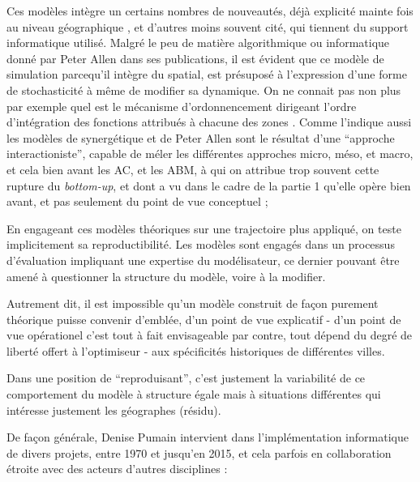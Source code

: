 Ces modèles intègre un certains nombres de nouveautés, déjà explicité mainte fois au niveau géographique \autocites{Pumain1989, Sanders1992}, et d'autres moins souvent cité, qui tiennent du support informatique utilisé. Malgré le peu de matière algorithmique ou informatique donné par Peter Allen dans ses publications, il est évident que ce modèle de simulation parcequ'il intègre du spatial, est présuposé à l'expression d'une forme de stochasticité à même de modifier sa dynamique. On ne connait pas non plus par exemple quel est le mécanisme d'ordonnencement dirigeant l'ordre d'intégration des fonctions attribués à chacune des zones \autocite[231-233]{Varenne2014}. Comme l'indique aussi \textcites[850]{Sanders2013}{Pumain2013} les modèles de synergétique et de Peter Allen sont le résultat d'une \enquote{approche interactioniste}, capable de méler les différentes approches micro, méso, et macro, et cela bien avant les AC, et les ABM, à qui on attribue trop souvent cette rupture du \textit{bottom-up}, et dont a vu dans le cadre de la partie 1 qu'elle opère bien avant, et pas seulement du point de vue conceptuel \autocites{Orcutt1957,Hagerstrand1967};

En engageant ces modèles théoriques sur une trajectoire plus appliqué, on teste implicitement sa reproductibilité. Les modèles sont engagés dans un processus d'évaluation impliquant une expertise du modélisateur, ce dernier pouvant être amené à questionner la structure du modèle, voire à la modifier. 

Autrement dit, il est impossible qu'un modèle construit de façon purement théorique puisse convenir d'emblée, d'un point de vue explicatif - d'un point de vue opérationel c'est tout à fait envisageable par contre, tout dépend du degré de liberté offert à l'optimiseur - aux spécificités historiques de différentes villes. 

Dans une position de \enquote{reproduisant}, c'est justement la variabilité de ce comportement du modèle à structure égale mais à situations différentes qui intéresse justement les géographes (résidu).

De façon générale, Denise Pumain intervient dans l’implémentation informatique de divers projets, entre 1970 et jusqu’en 2015, et cela parfois en collaboration étroite avec des acteurs d’autres disciplines :

